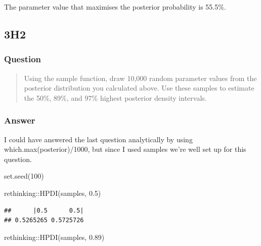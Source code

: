 \documentclass[
]{book}
\newenvironment{Shaded}{\begin{snugshade}}{\end{snugshade}}
\newcommand{\DecValTok}[1]{\textcolor[rgb]{0.00,0.00,0.81}{#1}}
\newcommand{\FloatTok}[1]{\textcolor[rgb]{0.00,0.00,0.81}{#1}}
\newcommand{\FunctionTok}[1]{\textcolor[rgb]{0.00,0.00,0.00}{#1}}
\newcommand{\NormalTok}[1]{#1}
\newcommand{\SpecialCharTok}[1]{\textcolor[rgb]{0.00,0.00,0.00}{#1}}
\begin{document}
The parameter value that maximises the posterior probability is 55.5\%.

\hypertarget{h2-1}{%
\subsection*{3H2}\label{h2-1}}

\hypertarget{question-29}{%
\subsubsection*{Question}\label{question-29}}

\begin{quote}
Using the sample function, draw 10,000 random parameter values from the posterior distribution you calculated above. Use these samples to estimate the 50\%, 89\%, and 97\% highest posterior density intervals.
\end{quote}

\hypertarget{answer-29}{%
\subsubsection*{Answer}\label{answer-29}}

I could have answered the last question analytically by using which.max(posterior)/1000, but since I used samples we're well set up for this question.

\begin{Shaded}
\begin{Highlighting}[]
\FunctionTok{set.seed}\NormalTok{(}\DecValTok{100}\NormalTok{)}

\NormalTok{rethinking}\SpecialCharTok{::}\FunctionTok{HPDI}\NormalTok{(samples, }\FloatTok{0.5}\NormalTok{)}
\end{Highlighting}
\end{Shaded}

\begin{verbatim}
##      |0.5      0.5| 
## 0.5265265 0.5725726
\end{verbatim}

\begin{Shaded}
\begin{Highlighting}[]
\NormalTok{rethinking}\SpecialCharTok{::}\FunctionTok{HPDI}\NormalTok{(samples, }\FloatTok{0.89}\NormalTok{)}
\end{Highlighting}
\end{Shaded}
\end{document}

